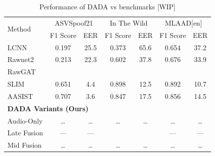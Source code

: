 \documentclass{Interspeech}
\begin{document}
\begin{table}[!htp]\centering
  \scriptsize
  \begin{tabular}{lcccccc}
    \toprule
    \multirow{2}{*}{Method} & \multicolumn{2}{c}{ASVSpoof21} & \multicolumn{2}{c}{In The Wild} & \multicolumn{2}{c}{MLAAD[en]}                            \\\cmidrule{2-7}
                            & F1 Score                       & EER                             & F1 Score                      & EER   & F1 Score & EER   \\\cmidrule{1-7}
    LCNN~\cite{lfcc_lcnn}   & 0.197                          & 25.5                            & 0.373                         & 65.6  & 0.654    & 37.2  \\
    Rawnet2~\cite{rawnet2}  & 0.213                          & 22.3                            & 0.602                         & 37.8  & 0.676    & 33.9  \\
    RawGAT~\cite{rawgat}    &                                &                                 &                               &       &          &       \\
    SLIM~\cite{slim}        & 0.651                          & 4.4                             & 0.898                         & 12.5  & 0.892    & 10.7  \\
    AASIST~\cite{aasist}    & 0.707                          & 3.6                             & 0.847                         & 17.5  & 0.856    & 14.5  \\ \midrule
    \multicolumn{7}{l}{\textbf{DADA Variants (Ours)}}                                                                                                     \\
    Audio-Only              & \dots                          & \dots                           & \dots                         & \dots & \dots    & \dots \\
    Late Fusion             & ---                            & ---                             &                               &       & ---      & ---   \\
    Mid Fusion              & \dots                          & \dots                           & \dots                         & \dots & \dots    & \dots \\\midrule
    \bottomrule
  \end{tabular}
  \caption{Performance of DADA vs benchmarks [WIP] }\label{tab:global_results}
\end{table}
\end{document}
